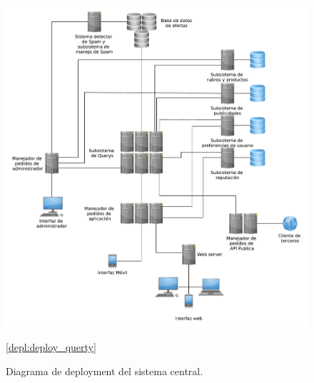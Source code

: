 \begin{figure}[H]
	\centering
	\includegraphics[width=\textwidth]{graficos/deploy/deploy_cont.pdf}
	\caption{Diagrama de deployment del sistema central.}
	\ref{depl:deploy_querty}
\end{figure}



